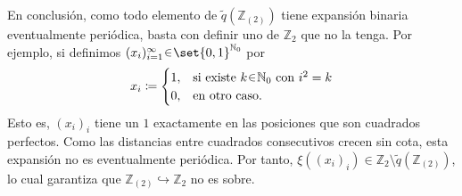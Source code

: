 \begin{sol}
En conclusión, como todo elemento de $\tilde q(\mathbb{Z}_{(2)})$ tiene expansión binaria
eventualmente periódica, basta con definir uno de $\mathbb{Z}_2$ que no la tenga. Por ejemplo, si definimos $(x_i)^\infty_{i=1} \en \set{0,1}^{\mathbb{N}_0}$ por
\[
x_i \coloneq 
\begin{cases}
    1, &\text{si existe $k\en\mathbb{N}_0$ con $i^2=k$}\\
    0, &\text{en otro caso.}
\end{cases}
\]
Esto es, $(x_i)_i$ tiene un $1$ exactamente en las posiciones que son
cuadrados perfectos. Como las distancias entre cuadrados consecutivos crecen
sin cota, esta expansión no es eventualmente periódica. Por tanto,
$\xi((x_i)_i)\in \mathbb{Z}_2\setminus\widetilde q(\mathbb{Z}_{(2)})$, lo cual garantiza que
$\mathbb{Z}_{(2)}\hookrightarrow\mathbb{Z}_2$ no es sobre.
\end{sol}